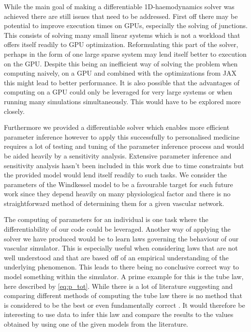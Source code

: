\documentclass[a4paper, oneside]{discothesis}
\begin{document}
While the main goal of making a differentiable 1D-haemodynamics solver was achieved there are still issues that need to be addressed.
First off there may be potential to improve execution times on GPUs, especially the solving of junctions. 
This consists of solving many small linear systems which is not a workload that offers itself readily to GPU optimization.
Reformulating this part of the solver, perhaps in the form of one large sparse system may lend itself better to execution on the GPU.
Despite this being an inefficient way of solving the problem when computing naively, on a GPU and combined with the optimizations from JAX this might lead to better performance.
It is also possible that the advantages of computing on a GPU could only be leveraged for very large systems or when running many simulations simultaneously.
This would have to be explored more closely.

Furthermore we provided a differentiable solver which enables more efficient parameter inference however to apply this successfully to personalised medicine requires a lot of testing and tuning of the parameter inference process and would be aided heavily by a sensitivity analysis.
Extensive parameter inference and sensitivity analysis hasn't been included in this work due to time constraints but the provided model would lend itself readily to such tasks.
We consider the parameters of the Windkessel model to be a favourable target for such future work since they depend heavily on many physiological factor and there is no straightforward method of determining them for a given vascular network.

The computing of parameters for an individual is one task where the differentiability of our code could be leveraged.
Another way of applying the solver we have produced would be to learn laws governing the behaviour of our vascular simulator.
This is especially useful when considering laws that are not well understood and that are based off of an empirical understanding of the underlying phenomenon.
This leads to there being no conclusive correct way to model something within the simulator.
A prime example for this is the tube law, here described by \autoref{eq:p_tot}.
While there is a lot of literature suggesting and comparing different methods of computing the tube law there is no method that is considered to be the best or even fundamentally correct \cite{gomez2017analysis}.
It would therefore be interesting to use data to infer this law and compare the results to the values obtained by using one of the given models from the literature.
\end{document}

